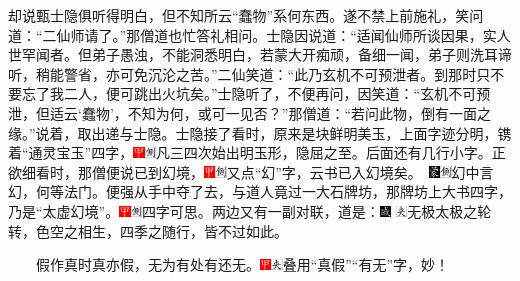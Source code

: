 却说甄士隐俱听得明白，但不知所云``蠢物''系何东西。遂不禁上前施礼，笑问道：``二仙师请了。''那僧道也忙答礼相问。士隐因说道：``适闻仙师所谈因果，实人世罕闻者。但弟子愚浊，不能洞悉明白，若蒙大开痴顽，备细一闻，弟子则洗耳谛听，稍能警省，亦可免沉沦之苦。''二仙笑道：``此乃玄机不可预泄者。到那时只不要忘了我二人，便可跳出火坑矣。''士隐听了，不便再问，因笑道：``玄机不可预泄，但适云`蠢物'，不知为何，或可一见否？''那僧道：``若问此物，倒有一面之缘。''说着，取出递与士隐。士隐接了看时，原来是块鲜明美玉，上面字迹分明，镌着``通灵宝玉''四字，{\includegraphics[width=3mm]{../Images/00002}\includegraphics[width=3mm]{../Images/00011}\footnotesize 凡三四次始出明玉形，隐屈之至。}后面还有几行小字。正欲细看时，那僧便说已到幻境，{{\includegraphics[width=3mm]{../Images/00002}\includegraphics[width=3mm]{../Images/00011}\footnotesize 又点``幻''字，云书已入幻境矣。　}\includegraphics[width=3mm]{../Images/00006}\includegraphics[width=3mm]{../Images/00011}\footnotesize 幻中言幻，何等法门。}便强从手中夺了去，与道人竟过一大石牌坊，那牌坊上大书四字，乃是``太虚幻境''。{\includegraphics[width=3mm]{../Images/00002}\includegraphics[width=3mm]{../Images/00011}\footnotesize 四字可思。}两边又有一副对联，道是：{\includegraphics[width=3mm]{../Images/00005} \includegraphics[width=3mm]{../Images/00012}\footnotesize   无极太极之轮转，色空之相生，四季之随行，皆不过如此。}

　　假作真时真亦假，无为有处有还无。{\includegraphics[width=3mm]{../Images/00002}\includegraphics[width=3mm]{../Images/00012}\footnotesize   叠用``真假''``有无''字，妙！}

